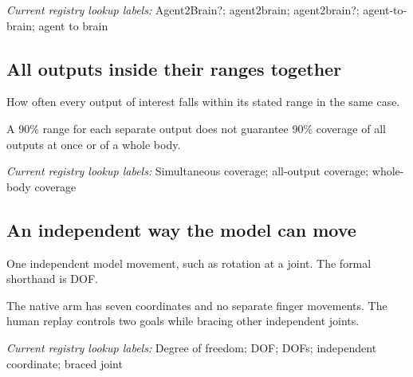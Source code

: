\noindent\textit{Current registry lookup labels:} Agent2Brain?; agent2brain; agent2brain?; agent-to-brain; agent to brain\par

\begin{samepage}
\subsection*{All outputs inside their ranges together}
\noindent How often every output of interest falls within its stated range in the same case.\par
\end{samepage}
\begin{samepage}
\noindent A 90\% range for each separate output does not guarantee 90\% coverage of all outputs at once or of a whole body.\par\nopagebreak[4]

\end{samepage}


\noindent\textit{Current registry lookup labels:} Simultaneous coverage; all-output coverage; whole-body coverage\par

\begin{samepage}
\subsection*{An independent way the model can move}
\noindent One independent model movement, such as rotation at a joint. The formal shorthand is DOF.\par
\end{samepage}
\begin{samepage}
\noindent The native arm has seven coordinates and no separate finger movements. The human replay controls two goals while bracing other independent joints.\par\nopagebreak[4]

\end{samepage}


\noindent\textit{Current registry lookup labels:} Degree of freedom; DOF; DOFs; independent coordinate; braced joint\par

